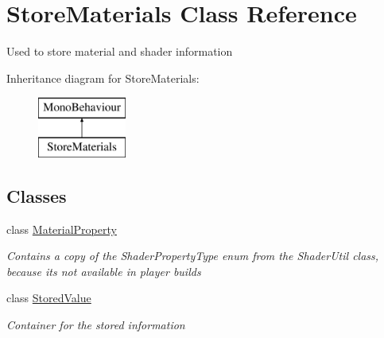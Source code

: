 \hypertarget{class_store_materials}{}\section{Store\+Materials Class Reference}
\label{class_store_materials}


Used to store material and shader information  


Inheritance diagram for Store\+Materials\+:\begin{figure}[H]
\begin{center}
\leavevmode
\includegraphics[height=2.000000cm]{class_store_materials}
\end{center}
\end{figure}
\subsection*{Classes}
\begin{DoxyCompactItemize}
\item 
class \hyperlink{class_store_materials_1_1_material_property}{Material\+Property}
\begin{DoxyCompactList}\small\item\em Contains a copy of the Shader\+Property\+Type enum from the Shader\+Util class, because it\textquotesingle{}s not available in player builds \end{DoxyCompactList}\item 
class \hyperlink{class_store_materials_1_1_stored_value}{Stored\+Value}
\begin{DoxyCompactList}\small\item\em Container for the stored information \end{DoxyCompactList}\end{DoxyCompactItemize}
